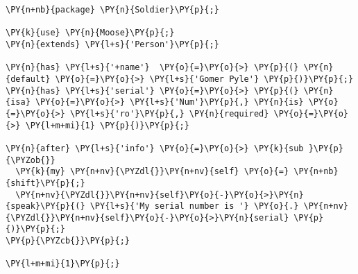 \begin{Verbatim}[commandchars=\\\{\}]
\PY{n+nb}{package} \PY{n}{Soldier}\PY{p}{;}

\PY{k}{use} \PY{n}{Moose}\PY{p}{;}
\PY{n}{extends} \PY{l+s}{'Person'}\PY{p}{;}

\PY{n}{has} \PY{l+s}{'+name'}  \PY{o}{=}\PY{o}{>} \PY{p}{(} \PY{n}{default} \PY{o}{=}\PY{o}{>} \PY{l+s}{'Gomer Pyle'} \PY{p}{)}\PY{p}{;}
\PY{n}{has} \PY{l+s}{'serial'} \PY{o}{=}\PY{o}{>} \PY{p}{(} \PY{n}{isa} \PY{o}{=}\PY{o}{>} \PY{l+s}{'Num'}\PY{p}{,} \PY{n}{is} \PY{o}{=}\PY{o}{>} \PY{l+s}{'ro'}\PY{p}{,} \PY{n}{required} \PY{o}{=}\PY{o}{>} \PY{l+m+mi}{1} \PY{p}{)}\PY{p}{;}

\PY{n}{after} \PY{l+s}{'info'} \PY{o}{=}\PY{o}{>} \PY{k}{sub }\PY{p}{\PYZob{}}
  \PY{k}{my} \PY{n+nv}{\PYZdl{}}\PY{n+nv}{self} \PY{o}{=} \PY{n+nb}{shift}\PY{p}{;}
  \PY{n+nv}{\PYZdl{}}\PY{n+nv}{self}\PY{o}{-}\PY{o}{>}\PY{n}{speak}\PY{p}{(} \PY{l+s}{'My serial number is '} \PY{o}{.} \PY{n+nv}{\PYZdl{}}\PY{n+nv}{self}\PY{o}{-}\PY{o}{>}\PY{n}{serial} \PY{p}{)}\PY{p}{;}
\PY{p}{\PYZcb{}}\PY{p}{;}

\PY{l+m+mi}{1}\PY{p}{;}
\end{Verbatim}
